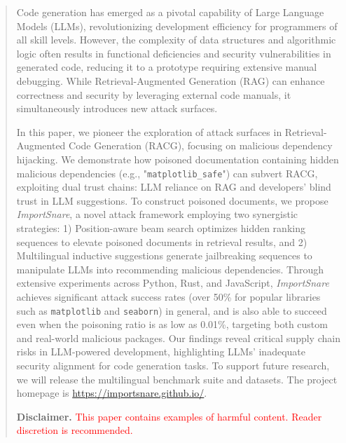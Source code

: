 \documentclass[sigconf]{acmart}
\begin{document}



\begin{abstract}  

Code generation has emerged as a pivotal capability of Large Language Models (LLMs), revolutionizing development efficiency for programmers of all skill levels. 
%
However, the complexity of data structures and algorithmic logic often results in functional deficiencies and security vulnerabilities in generated code, reducing it to a prototype requiring extensive manual debugging. 
%
While Retrieval-Augmented Generation (RAG) can enhance correctness and security by leveraging external code manuals, it simultaneously introduces new attack surfaces.


In this paper, we pioneer the exploration of attack surfaces in Retrieval-Augmented Code Generation (RACG), focusing on malicious dependency hijacking. 
%
We demonstrate how poisoned documentation containing hidden malicious dependencies (e.g., "\texttt{matplotlib\_safe}") can subvert RACG, exploiting dual trust chains: LLM reliance on RAG and developers’ blind trust in LLM suggestions.
%
To construct poisoned documents, we propose \textit{ImportSnare}, a novel attack framework employing two synergistic strategies: 1) Position-aware beam search optimizes hidden ranking sequences to elevate poisoned documents in retrieval results, and 2) Multilingual inductive suggestions generate jailbreaking sequences to manipulate LLMs into recommending malicious dependencies.
%
Through extensive experiments across Python, Rust, and JavaScript, \textit{ImportSnare} achieves significant attack success rates (over 50\% for popular libraries such as \texttt{matplotlib} and \texttt{seaborn}) in general, and is also able to succeed even when the poisoning ratio is as low as 0.01\%, targeting both custom and real-world malicious packages.
%
Our findings reveal critical supply chain risks in LLM-powered development, highlighting LLMs’ inadequate security alignment for code generation tasks. 
% 
To support future research, we will release the multilingual benchmark suite and datasets. 
The project homepage is \url{https://importsnare.github.io/}.


\textbf{Disclaimer.} \textcolor{red}{This paper contains examples of harmful content. Reader discretion is recommended.}
\end{abstract}
\end{document}
